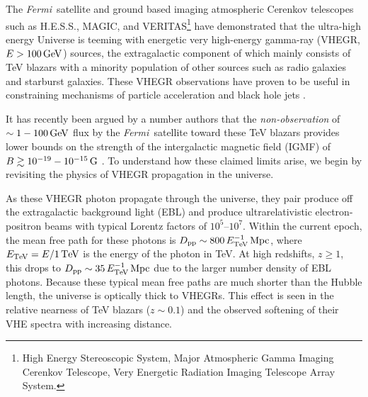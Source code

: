 \documentclass[usenatbib,iop,apj,numberedappendix]{aeb_emulateapj_2010}
\newcommand\qc[1]{{\color{red} \bf #1}}
\def\eV{{\rm eV}} %
\def\GeV{{\rm G}\eV} %
\def\TeV{{\rm T}\eV} %
\newcommand{\rmn}{\mathrm}
\def\Dpp{D_{\rm pp}}
\newcommand{\Mpc}{\ensuremath{\rm Mpc}}
\def\G{{\rm G}}
\def\Fermi{{\em Fermi\ }}
\begin{document}
The \Fermi satellite and ground based imaging atmospheric Cerenkov telescopes such as
H.E.S.S., MAGIC, and VERITAS\footnote{High Energy
  Stereoscopic System, Major Atmospheric Gamma Imaging Cerenkov Telescope, Very
  Energetic Radiation Imaging Telescope Array System.} have demonstrated that the ultra-high
energy Universe is teeming with energetic very high-energy gamma-ray 
(VHEGR, $E > 100\,\GeV$) sources, the extragalactic component of which mainly consists of TeV
blazars with a minority population of other sources  such as radio galaxies
and starburst galaxies.  These VHEGR observations have proven to be useful in constraining mechanisms 
of particle acceleration
\citep[see, e.g., ][]{Pagl_etal:96,Domi-Torr:05,Thom-Quat-Waxm:07,Pers-Reph-Arie:08,deCe-Torr-Rodr:09,Reph-Arie-Pers:10,Lack_etal:10} and
black hole jets
\citep[see, e.g., ][]{Jones+1974,Ghisellini+1989,Ghisellini+2008,Tavecchio+2008,Ghisellini+2009}.

It has recently been argued by a number authors
that the {\it non-observation} of $\sim 1-100\,\GeV$ flux by the \Fermi satellite toward these TeV blazars provides lower bounds on the strength of the  intergalactic magnetic field (IGMF) of $B\gtrsim 10^{-19}-10^{-15}\,\G$ \citep{Nero-Vovk:10,Tave_etal:10a,Tave_etal:10b,Derm_etal:10,Tayl-Vovk-Nero:11,Dola_etal:11,Taka_etal:11,Vovk+12}.
To understand how these claimed limits arise, we begin by revisiting the physics of VHEGR propagation in the universe.

As these VHEGR photon propagate through the universe, they pair produce off the extragalactic background light (EBL) and produce ultrarelativistic electron-positron beams  with typical Lorentz factors of $10^5$--$10^7$.  
Within the current epoch, the mean free path for these photons is $\Dpp\sim 800 \,E_{\TeV}^{-1}\,\Mpc$, where $E_{\TeV} = E/1\,\TeV$ is the energy of the photon in \TeV.  At high redshifts, $z\geq 1$, this drops to $D_{\rmn{pp}}\sim 35\, E_{\TeV}^{-1}\,\Mpc$ due to the larger number density of EBL photons.  Because these typical mean free paths are much shorter than the Hubble length, the universe is optically thick to VHEGRs. This effect is seen in the relative nearness of TeV blazars ($z\sim 0.1$) and the observed softening of their VHE spectra with increasing distance.  
\end{document}
